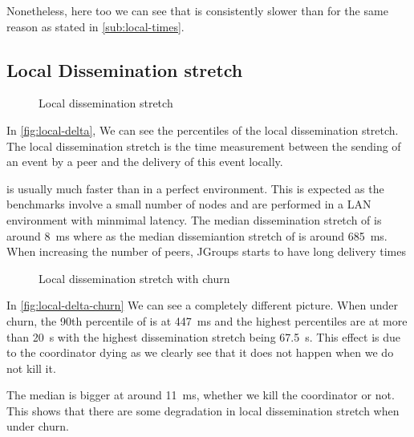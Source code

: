 Nonetheless, here too we can see that \epto is consistently slower than \jgroups for the same reason as stated in \autoref{sub:local-times}.
\newpage
\subsection{Local Dissemination stretch}
\begin{figure}[h]
	\centering
	
	\vspace{-2mm} 
	\caption{Local dissemination stretch}
	\vspace{-2mm}
	\label{fig:local-delta}  
\end{figure}
In \autoref{fig:local-delta}, We can see the percentiles of the local dissemination stretch. The local dissemination stretch is the time measurement between the sending of an event by a peer and the delivery of this event locally.

\jgroups is usually much faster than \epto in a perfect environment. This is expected as the benchmarks involve a small number of nodes and are performed in a LAN environment with minmimal latency. The median dissemination stretch of \jgroups is around \SI{8}{\milli\second} where as the median dissemiantion stretch of \epto is around \SI{685}{\milli\second}. When increasing the number of peers, JGroups starts to have long delivery times

\begin{figure}[h]
	\centering
	
	\vspace{-2mm} 
	\caption{Local dissemination stretch with churn}
	\vspace{-2mm}
	\label{fig:local-delta-churn}   
\end{figure}
In \autoref{fig:local-delta-churn} We can see a completely different picture. When under churn, the 90th percentile of \jgroups is at \SI{447}{\milli\second} and the highest percentiles are at more than \SI{20}{\second} with the highest dissemination stretch being \SI{67.5}{\second}. This effect is due to the coordinator dying as we clearly see that it does not happen when we do not kill it.

The median is bigger at around \SI{11}{\milli\second}, whether we kill the coordinator or not. This shows that there are some degradation in \jgroups local dissemination stretch when under churn.

